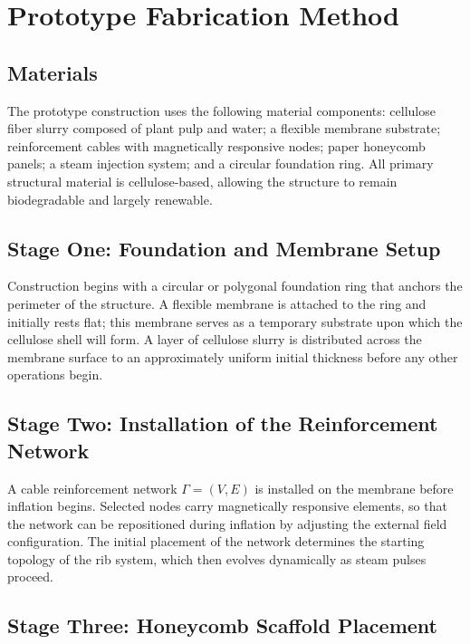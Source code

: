 \documentclass[12pt,a4paper]{article}
\begin{document}
\section{Prototype Fabrication Method}

\subsection{Materials}

The prototype construction uses the following material components:
cellulose fiber slurry composed of plant pulp and water; a flexible
membrane substrate; reinforcement cables with magnetically responsive
nodes; paper honeycomb panels; a steam injection system; and a circular
foundation ring. All primary structural material is cellulose-based,
allowing the structure to remain biodegradable and largely renewable.

\subsection{Stage One: Foundation and Membrane Setup}

Construction begins with a circular or polygonal foundation ring that
anchors the perimeter of the structure. A flexible membrane is attached
to the ring and initially rests flat; this membrane serves as a
temporary substrate upon which the cellulose shell will form. A layer
of cellulose slurry is distributed across the membrane surface to an
approximately uniform initial thickness before any other operations
begin.

\subsection{Stage Two: Installation of the Reinforcement Network}

A cable reinforcement network $\Gamma = (V,E)$ is installed on the
membrane before inflation begins. Selected nodes carry magnetically
responsive elements, so that the network can be repositioned during
inflation by adjusting the external field configuration. The initial
placement of the network determines the starting topology of the rib
system, which then evolves dynamically as steam pulses proceed.

\subsection{Stage Three: Honeycomb Scaffold Placement}
\end{document}
